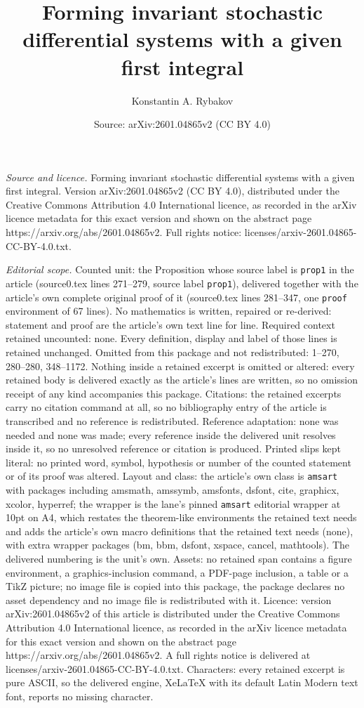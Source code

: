 \documentclass[10pt,a4paper]{amsart}
\title[Forming invariant stochastic differential systems with a giv]{Forming invariant stochastic differential systems with a given first integral}
\author{Konstantin A. Rybakov}
\date{Source: arXiv:2601.04865v2 (CC BY 4.0)}
\begin{document}
\maketitle

\noindent\emph{Source and licence.} Forming invariant stochastic differential systems with a given first integral. Version arXiv:2601.04865v2 (CC BY 4.0), distributed under the Creative Commons Attribution 4.0 International licence, as recorded in the arXiv licence metadata for this exact version and shown on the abstract page https://arxiv.org/abs/2601.04865v2. Full rights notice: licenses/arxiv-2601.04865-CC-BY-4.0.txt.\par\smallskip

\noindent\textit{Editorial scope.} Counted unit: the Proposition whose source label is \texttt{prop1} in the article (source0.tex lines 271--279, source label \texttt{prop1}), delivered together with the article's own complete original proof of it (source0.tex lines 281--347, one \texttt{proof} environment of 67 lines). No mathematics is written, repaired or re-derived: statement and proof are the article's own text line for line. Required context retained uncounted: none. Every definition, display and label of those lines is retained unchanged. Omitted from this package and not redistributed: 1--270, 280--280, 348--1172. Nothing inside a retained excerpt is omitted or altered: every retained body is delivered exactly as the article's lines are written, so no omission receipt of any kind accompanies this package. Citations: the retained excerpts carry no citation command at all, so no bibliography entry of the article is transcribed and no reference is redistributed. Reference adaptation: none was needed and none was made; every reference inside the delivered unit resolves inside it, so no unresolved reference or citation is produced. Printed slips kept literal: no printed word, symbol, hypothesis or number of the counted statement or of its proof was altered. Layout and class: the article's own class is \texttt{amsart} with packages including amsmath, amssymb, amsfonts, dsfont, cite, graphicx, xcolor, hyperref; the wrapper is the lane's pinned \texttt{amsart} editorial wrapper at 10pt on A4, which restates the theorem-like environments the retained text needs and adds the article's own macro definitions that the retained text needs (none), with extra wrapper packages (bm, bbm, dsfont, xspace, cancel, mathtools). The delivered numbering is the unit's own. Assets: no retained span contains a figure environment, a graphics-inclusion command, a PDF-page inclusion, a table or a TikZ picture; no image file is copied into this package, the package declares no asset dependency and no image file is redistributed with it. Licence: version arXiv:2601.04865v2 of this article is distributed under the Creative Commons Attribution 4.0 International licence, as recorded in the arXiv licence metadata for this exact version and shown on the abstract page https://arxiv.org/abs/2601.04865v2. A full rights notice is delivered at licenses/arxiv-2601.04865-CC-BY-4.0.txt. Characters: every retained excerpt is pure ASCII, so the delivered engine, XeLaTeX with its default Latin Modern text font, reports no missing character.
\end{document}
